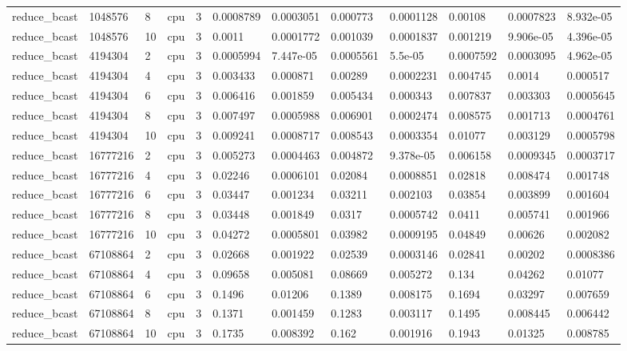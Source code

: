 \begin{tabular}{llllllllllll}
reduce\_bcast & 1048576 & 8 & cpu & 3 & 0.0008789 & 0.0003051 & 0.000773 & 0.0001128 & 0.00108 & 0.0007823 & 8.932e-05 \\
reduce\_bcast & 1048576 & 10 & cpu & 3 & 0.0011 & 0.0001772 & 0.001039 & 0.0001837 & 0.001219 & 9.906e-05 & 4.396e-05 \\
reduce\_bcast & 4194304 & 2 & cpu & 3 & 0.0005994 & 7.447e-05 & 0.0005561 & 5.5e-05 & 0.0007592 & 0.0003095 & 4.962e-05 \\
reduce\_bcast & 4194304 & 4 & cpu & 3 & 0.003433 & 0.000871 & 0.00289 & 0.0002231 & 0.004745 & 0.0014 & 0.000517 \\
reduce\_bcast & 4194304 & 6 & cpu & 3 & 0.006416 & 0.001859 & 0.005434 & 0.000343 & 0.007837 & 0.003303 & 0.0005645 \\
reduce\_bcast & 4194304 & 8 & cpu & 3 & 0.007497 & 0.0005988 & 0.006901 & 0.0002474 & 0.008575 & 0.001713 & 0.0004761 \\
reduce\_bcast & 4194304 & 10 & cpu & 3 & 0.009241 & 0.0008717 & 0.008543 & 0.0003354 & 0.01077 & 0.003129 & 0.0005798 \\
reduce\_bcast & 16777216 & 2 & cpu & 3 & 0.005273 & 0.0004463 & 0.004872 & 9.378e-05 & 0.006158 & 0.0009345 & 0.0003717 \\
reduce\_bcast & 16777216 & 4 & cpu & 3 & 0.02246 & 0.0006101 & 0.02084 & 0.0008851 & 0.02818 & 0.008474 & 0.001748 \\
reduce\_bcast & 16777216 & 6 & cpu & 3 & 0.03447 & 0.001234 & 0.03211 & 0.002103 & 0.03854 & 0.003899 & 0.001604 \\
reduce\_bcast & 16777216 & 8 & cpu & 3 & 0.03448 & 0.001849 & 0.0317 & 0.0005742 & 0.0411 & 0.005741 & 0.001966 \\
reduce\_bcast & 16777216 & 10 & cpu & 3 & 0.04272 & 0.0005801 & 0.03982 & 0.0009195 & 0.04849 & 0.00626 & 0.002082 \\
reduce\_bcast & 67108864 & 2 & cpu & 3 & 0.02668 & 0.001922 & 0.02539 & 0.0003146 & 0.02841 & 0.00202 & 0.0008386 \\
reduce\_bcast & 67108864 & 4 & cpu & 3 & 0.09658 & 0.005081 & 0.08669 & 0.005272 & 0.134 & 0.04262 & 0.01077 \\
reduce\_bcast & 67108864 & 6 & cpu & 3 & 0.1496 & 0.01206 & 0.1389 & 0.008175 & 0.1694 & 0.03297 & 0.007659 \\
reduce\_bcast & 67108864 & 8 & cpu & 3 & 0.1371 & 0.001459 & 0.1283 & 0.003117 & 0.1495 & 0.008445 & 0.006442 \\
reduce\_bcast & 67108864 & 10 & cpu & 3 & 0.1735 & 0.008392 & 0.162 & 0.001916 & 0.1943 & 0.01325 & 0.008785 \\

\end{tabular}
